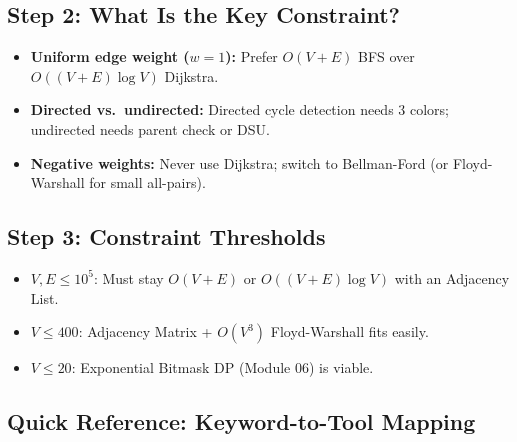 \documentclass[11pt,a4paper]{article}
\theoremstyle{definition}
\begin{document}
\subsection*{Step 2: What Is the Key Constraint?}
\begin{itemize}
    \item \textbf{Uniform edge weight ($w = 1$):} Prefer $O(V + E)$ BFS over $O((V + E) \log V)$ Dijkstra.
    \item \textbf{Directed vs.\ undirected:} Directed cycle detection needs 3 colors; undirected needs parent check or DSU.
    \item \textbf{Negative weights:} Never use Dijkstra; switch to Bellman-Ford (or Floyd-Warshall for small all-pairs).
\end{itemize}

\subsection*{Step 3: Constraint Thresholds}
\begin{itemize}
    \item $V, E \le 10^5$: Must stay $O(V + E)$ or $O((V + E) \log V)$ with an Adjacency List.
    \item $V \le 400$: Adjacency Matrix + $O(V^3)$ Floyd-Warshall fits easily.
    \item $V \le 20$: Exponential Bitmask DP (Module 06) is viable.
\end{itemize}

\subsection*{Quick Reference: Keyword-to-Tool Mapping}
\end{document}
